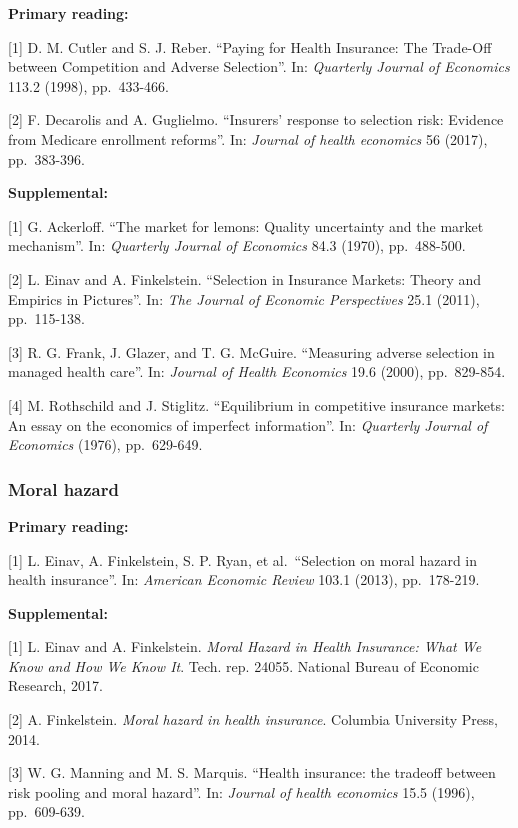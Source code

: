 \documentclass[11pt,]{article}
\begin{document}
\textbf{Primary reading:}

{[}1{]} D. M. Cutler and S. J. Reber. ``Paying for Health Insurance: The
Trade-Off between Competition and Adverse Selection''. In:
\emph{Quarterly Journal of Economics} 113.2 (1998), pp.~433-466.

{[}2{]} F. Decarolis and A. Guglielmo. ``Insurers' response to selection
risk: Evidence from Medicare enrollment reforms''. In: \emph{Journal of
health economics} 56 (2017), pp.~383-396.

\textbf{Supplemental:}

{[}1{]} G. Ackerloff. ``The market for lemons: Quality uncertainty and
the market mechanism''. In: \emph{Quarterly Journal of Economics} 84.3
(1970), pp.~488-500.

{[}2{]} L. Einav and A. Finkelstein. ``Selection in Insurance Markets:
Theory and Empirics in Pictures''. In: \emph{The Journal of Economic
Perspectives} 25.1 (2011), pp.~115-138.

{[}3{]} R. G. Frank, J. Glazer, and T. G. McGuire. ``Measuring adverse
selection in managed health care''. In: \emph{Journal of Health
Economics} 19.6 (2000), pp.~829-854.

{[}4{]} M. Rothschild and J. Stiglitz. ``Equilibrium in competitive
insurance markets: An essay on the economics of imperfect information''.
In: \emph{Quarterly Journal of Economics} (1976), pp.~629-649.

\hypertarget{moral-hazard}{%
\subsubsection{Moral hazard}\label{moral-hazard}}

\textbf{Primary reading:}

{[}1{]} L. Einav, A. Finkelstein, S. P. Ryan, et al.~``Selection on
moral hazard in health insurance''. In: \emph{American Economic Review}
103.1 (2013), pp.~178-219.

\textbf{Supplemental:}

{[}1{]} L. Einav and A. Finkelstein. \emph{Moral Hazard in Health
Insurance: What We Know and How We Know It}. Tech. rep. 24055. National
Bureau of Economic Research, 2017.

{[}2{]} A. Finkelstein. \emph{Moral hazard in health insurance}.
Columbia University Press, 2014.

{[}3{]} W. G. Manning and M. S. Marquis. ``Health insurance: the
tradeoff between risk pooling and moral hazard''. In: \emph{Journal of
health economics} 15.5 (1996), pp.~609-639.
\end{document}
